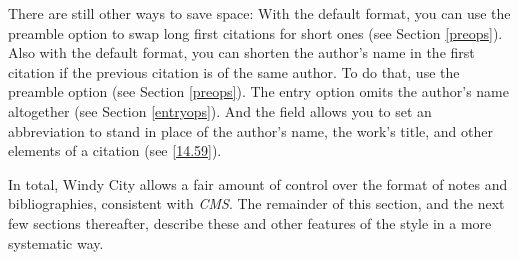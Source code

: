 \documentclass[11pt,letterpaper,oneside]{article}
\begin{document}
\begin{citeonly}
\item \cite[3]{morrison2004a}
\item \cite[18]{morrison2004a}
\item \cite[18]{morrison2004a}
\item \cite[24--26]{morrison2004a}
\item \cite[401-2]{morrison2004b}
\item \cite[433]{morrison2004b}
\item \cite[37--38]{diaz2008}
\item \cite[403]{morrison2004b}
\item \cite[152]{diaz2008}
\item \cite[201-2]{diaz2008}
\item \cites[240]{morrison2004b}[32]{morrison2004a}
\item \cite[33]{morrison2004a}
\end{citeonly}

There are still other ways to save space: With the default format, you
can use the preamble option  to swap long first
citations for short ones (see Section \ref{preops}). Also with the
default format, you can shorten the author's name in the first
citation if the previous citation is of the same author. To do that,
use the preamble option  (see Section \ref{preops}).
The entry option  omits the author's name altogether (see
Section \ref{entryops}). And the field  allows you
to set an abbreviation to stand in place of the author's name, the
work's title, and other elements of a citation (see \ref{14.59}).

In total, Windy City allows a fair amount of control over the format
of notes and bibliographies, consistent with \textit{CMS}. The
remainder of this section, and the next few sections thereafter,
describe these and other features of the style in a more systematic
way.
\end{document}
